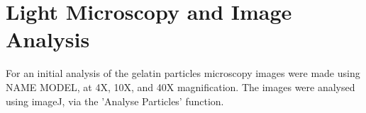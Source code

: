 \section{Light Microscopy and Image Analysis}
For an initial analysis of the gelatin particles microscopy images were made using NAME MODEL, at 4X, 10X, and 40X magnification. The images were analysed using imageJ, via the 'Analyse Particles' function. 